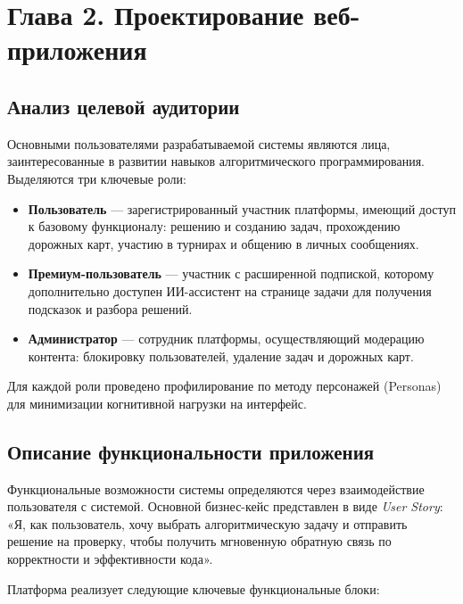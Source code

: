 \section*{Глава 2. Проектирование веб-приложения}


\subsection{Анализ целевой аудитории}

Основными пользователями разрабатываемой системы являются лица, заинтересованные
в развитии навыков алгоритмического программирования. Выделяются три ключевые роли:

\begin{itemize}
	\item \textbf{Пользователь} --- зарегистрированный участник платформы,
	      имеющий доступ к базовому функционалу: решению и созданию задач,
	      прохождению дорожных карт, участию в турнирах и общению в личных
	      сообщениях.
	\item \textbf{Премиум-пользователь} --- участник с расширенной подпиской,
	      которому дополнительно доступен ИИ-ассистент на странице задачи
	      для получения подсказок и разбора решений.
	\item \textbf{Администратор} --- сотрудник платформы, осуществляющий
	      модерацию контента: блокировку пользователей, удаление задач
	      и дорожных карт.
\end{itemize}

Для каждой роли проведено профилирование по методу персонажей (Personas) для
минимизации когнитивной нагрузки на интерфейс.

\subsection{Описание функциональности приложения}

Функциональные возможности системы определяются через взаимодействие пользователя
с системой. Основной бизнес-кейс представлен в виде \textit{User Story}: «Я, как
пользователь, хочу выбрать алгоритмическую задачу и отправить решение на проверку,
чтобы получить мгновенную обратную связь по корректности и эффективности кода».

Платформа реализует следующие ключевые функциональные блоки:

